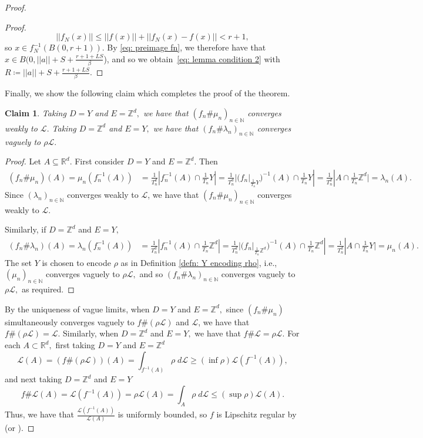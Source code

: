 \documentclass{article}
\newtheorem{claim}[define]{Claim}
\newcommand{\R}{\mathbb{R}}
\newcommand{\Z}{\mathbb{Z}}
\newcommand{\N}{\mathbb{N}}
\newcommand{\leb}{\mc{L}}
\newcommand{\mc}[1]{\mathcal{#1}}
\begin{document}
\begin{proof}
\begin{proof}
\begin{equation*}
    ||f_N(x)|| \leq ||f(x)||+||f_N(x)-f(x)|| < r+1,
\end{equation*} so $x \in f_N^{-1}(B(0,r+1)).$ By \eqref{eq: preimage fn}, we therefore have that $x \in B(0,||a||+S+\frac{r+1+LS}{\beta}$), and so we obtain~\eqref{eq: lemma condition 2} with $R \coloneqq ||a||+S+\frac{r+1+LS}{\beta}$.
\end{proof}
Finally, we show the following claim which completes the proof of the theorem.
\begin{claim} Taking $D = Y$ and $E = \Z^d,$ we have that
    $(f_n \# \mu_n)_{n \in\N}$ converges weakly to $\leb.$ Taking $D = \Z^d$ and $E = Y,$ we have that $(f_n \# \lambda_n)_{n \in\N}$ converges vaguely to $\rho\leb.$
\end{claim}
\begin{proof} Let $A \subseteq \R^d$. First consider $D =Y$ and $E = \Z^d$. Then 
    \begin{equation*}
    \begin{split}
       (f_n \# \mu_n)(A) = \mu_n(f_n^{-1}(A)) &= \tfrac{1}{T_n^d}|f_n^{-1}(A) \cap \tfrac{1}{T_n}Y|=\tfrac{1}{T_n^d}|({f_n}|_{\frac{1}{T_n}Y})^{-1}(A) \cap \tfrac{1}{T_n}Y| = \tfrac{1}{T_n^d}|A \cap \tfrac{1}{T_n}\Z^d|= \lambda_n(A) .
       \end{split}
    \end{equation*} Since $(\lambda_n)_{n \in \N}$ converges weakly to $\leb$, we have that $(f_n\#\mu_n)_{n \in \N}$ converges weakly to $\leb$. 

    Similarly, if $D = \Z^d$ and $E = Y,$ \begin{equation*}
    \begin{split}
       (f_n \# \lambda_n)(A) = \lambda_n(f_n^{-1}(A)) &= \tfrac{1}{T_n^d}|f_n^{-1}(A) \cap \tfrac{1}{T_n}\Z^d|= \tfrac{1}{T_n^d}|({f_n}|_{\frac{1}{T_n}\Z^d})^{-1}(A) \cap \tfrac{1}{T_n}\Z^d| = \tfrac{1}{T_n^d}|A \cap \tfrac{1}{T_n}Y|=\mu_n(A).
       \end{split}
    \end{equation*} 
    The set $Y$ is chosen to encode $\rho$ as in Definition \ref{defn: Y encoding rho}, i.e., $(\mu_n)_{n \in \N}$ converges vaguely to $\rho \leb,$ and so $(f_n \# \lambda_n)_{n \in \N}$ converges vaguely to $\rho \leb,$ as required.  
\end{proof}
By the uniqueness of vague limits, when $D = Y$ and $E = \Z^d,$ since $(f_n\#\mu_n)$ simultaneously converges vaguely to $f \#(\rho \leb)$ and $\leb$, we have that $f\#(\rho\leb) = \leb.$ Similarly, when $D = \Z^d$ and $E = Y,$ we have that $f \# \leb = \rho \leb.$ For each $A \subset \R^d,$ first taking $D = Y$ and $E = \Z^d$ $$\leb(A) = (f\#(\rho\leb))(A) = \int_{f^{-1}(A)}\rho \; d\leb \geq (\inf\rho) \leb(f^{-1}(A)),$$ and next taking $D = \Z^d$ and $E = Y$
$$f \# \leb(A) = \leb(f^{-1}(A)) = \rho\leb(A) = \int_{A} \rho \; d\leb \leq (\sup\rho) \leb(A).$$ Thus, we have that $\frac{\leb(f^{-1}(A))}{\leb(A)}$ is uniformly bounded, so $f$ is Lipschitz regular by \cite[Lemma~$12.6$]{david1997fractured} (or \cite[Lemma~$2.4$]{dymond2018mapping}).
\end{proof}
\end{document}
